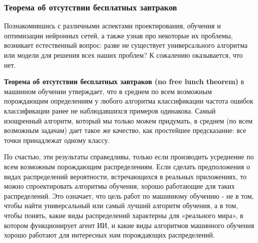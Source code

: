 


\subsubsection{Теорема об отсутствии бесплатных завтраков}

Познакомившись с различными аспектами проектирования, 
обучения и оптимизации нейронных сетей, а также узнав про некоторые их проблемы, 
возникает естественный вопрос: разве не существует универсального алгоритма или 
модели для решения всех наших проблем? К сожалению оказывается, что нет.

\textbf{Теорема об отсутствии бесплатных завтраков (no free lunch theorem)} 
в машинном обучении \cite{NFL} утверждает, что в среднем по 
всем возможным порождающим определениям у любого алгоритма классификации 
частота ошибок классификации ранее не наблюдавшихся примеров одинакова.
Самый изощренный алгоритм, который мы только можем придумать, в среднем (по
всем возможным задачам) дает такое же качество, как простейшее предсказание: все
точки принадлежат одному классу.

По счастью, эти результаты справедливы, только если производить усреднение по
всем возможным порождающим распределениям. Если сделать предположения о видах 
распределений вероятности, встречающихся в реальных приложениях, то можно
спроектировать алгоритмы обучения, хорошо работающие для таких распределений.
Это означает, что цель работ по машинному обучению - не в том, чтобы найти
универсальный или самый лучший алгоритм обучения, а в том, чтобы понять, какие
виды распределений характерны для «реального мира», в котором функционирует
агент ИИ, и какие виды алгоритмов машинного обучения хорошо работают для интересных 
нам порождающих распределений.

